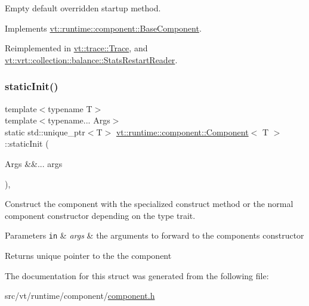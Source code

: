 Empty default overridden startup method. 



Implements \hyperlink{structvt_1_1runtime_1_1component_1_1_base_component_a8bf92f9f0a7027abf7deaefa2e7f5202}{vt\+::runtime\+::component\+::\+Base\+Component}.



Reimplemented in \hyperlink{structvt_1_1trace_1_1_trace_a5dd8767d9020ebeaba49ea3a684738a1}{vt\+::trace\+::\+Trace}, and \hyperlink{structvt_1_1vrt_1_1collection_1_1balance_1_1_stats_restart_reader_a0a2bd4e4f989766216237d6aedfaaa51}{vt\+::vrt\+::collection\+::balance\+::\+Stats\+Restart\+Reader}.

\mbox{\label{structvt_1_1runtime_1_1component_1_1_component_ac969a635e579cf7be3af696f500bf260}} 
\subsubsection{\texorpdfstring{static\+Init()}{staticInit()}}
{\footnotesize\ttfamily template$<$typename T$>$ \\
template$<$typename... Args$>$ \\
static std\+::unique\+\_\+ptr$<$T$>$ \hyperlink{structvt_1_1runtime_1_1component_1_1_component}{vt\+::runtime\+::component\+::\+Component}$<$ T $>$\+::static\+Init (\begin{DoxyParamCaption}\item[{Args \&\&...}]{args }\end{DoxyParamCaption})\hspace{0.3cm}{\ttfamily [inline]}, {\ttfamily [static]}}



Construct the component with the specialized construct method or the normal component constructor depending on the type trait. 


\begin{DoxyParams}[1]{Parameters}
\mbox{\tt in}  & {\em args} & the arguments to forward to the component\textquotesingle{}s constructor\\
\hline
\end{DoxyParams}
\begin{DoxyReturn}{Returns}
unique pointer to the the component 
\end{DoxyReturn}


The documentation for this struct was generated from the following file\+:\begin{DoxyCompactItemize}
\item 
src/vt/runtime/component/\hyperlink{component_8h}{component.\+h}\end{DoxyCompactItemize}

